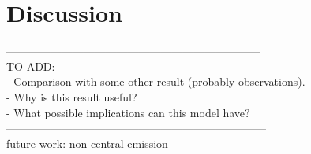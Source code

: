 \setcounter{equation}{0}
\chapter{Discussion}

---------------------------------------------------------------------\\
TO ADD: \\
- Comparison with some other result (probably observations).\\
- Why is this result useful? \\
- What possible implications can this model have?\\
-----------------------------------------------------------------------\\

future work: non central emission